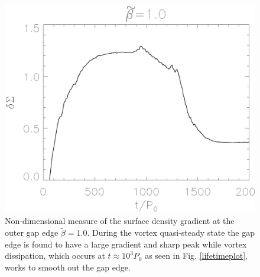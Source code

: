 \begin{figure}
  \includegraphics[width=\linewidth]{figures/gap_smoothness}
  \caption{Non-dimensional measure of the surface density gradient at
    the outer gap edge $\tilde\beta=1.0$. During the vortex quasi-steady state
    the gap edge is found to have a large gradient and sharp peak while vortex
    dissipation,
    which occurs at $t\approx10^3P_0$ as seen in Fig. \ref{lifetimeplot},
    works to smooth out the gap edge.
    \label{smoothnessplot}}  
\end{figure}




